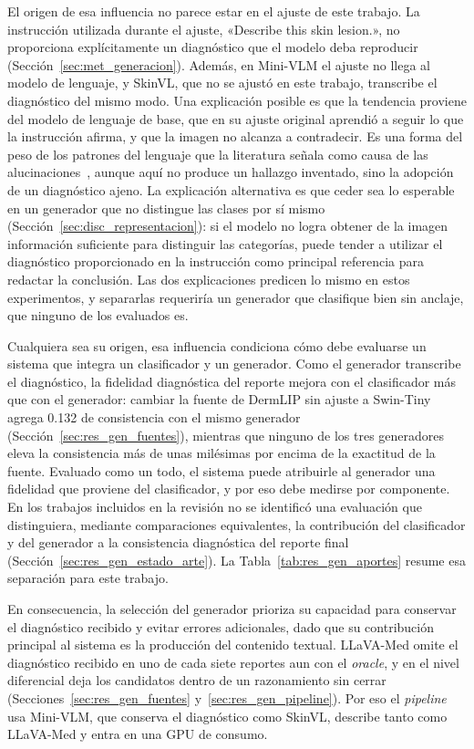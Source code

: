 El origen de esa influencia no parece estar en el ajuste de este trabajo. La instrucción utilizada durante el ajuste, «Describe this skin lesion.», no proporciona explícitamente un diagnóstico que el modelo deba reproducir (Sección~\ref{sec:met_generacion}). Además, en Mini-VLM el ajuste no llega al modelo de lenguaje, y SkinVL, que no se ajustó en este trabajo,
transcribe el diagnóstico del mismo modo. Una explicación posible es que la tendencia proviene del modelo de lenguaje
de base, que en su ajuste original aprendió a seguir lo que la instrucción afirma, y que la imagen no alcanza a
contradecir. Es una forma del peso de los patrones del lenguaje que la literatura señala como causa de las
alucinaciones~\cite{rohrbach2018object,bai2024hallucination}, aunque aquí no produce un hallazgo inventado, sino
la adopción de un diagnóstico ajeno. La explicación alternativa es que ceder sea lo esperable en un generador que no
distingue las clases por sí mismo (Sección~\ref{sec:disc_representacion}): si el modelo no logra obtener de la imagen información suficiente para distinguir las categorías, puede tender a utilizar el diagnóstico proporcionado en la instrucción como principal referencia para redactar la conclusión. Las dos explicaciones predicen lo mismo en estos experimentos,
y separarlas requeriría un generador que clasifique bien sin anclaje, que ninguno de los evaluados es.

Cualquiera sea su origen, esa influencia condiciona cómo debe evaluarse un sistema que integra un clasificador y un generador. Como el generador transcribe el
diagnóstico, la fidelidad diagnóstica del reporte mejora con el clasificador más que con el generador: cambiar la
fuente de DermLIP sin ajuste a Swin-Tiny agrega 0.132 de consistencia con el mismo generador
(Sección~\ref{sec:res_gen_fuentes}), mientras que ninguno de los tres generadores eleva la consistencia más de unas milésimas por encima de la exactitud de la fuente. Evaluado como un todo, el sistema puede atribuirle al generador una fidelidad que proviene del clasificador, y por eso debe medirse por componente. En los trabajos incluidos en la revisión no se identificó una evaluación que distinguiera, mediante comparaciones equivalentes, la contribución del clasificador y del generador a la consistencia diagnóstica del reporte final (Sección~\ref{sec:res_gen_estado_arte}). La Tabla~\ref{tab:res_gen_aportes} resume esa separación para este trabajo.

En consecuencia, la selección del generador prioriza su capacidad para conservar el diagnóstico recibido y evitar errores adicionales, dado que su contribución principal al sistema es la producción del contenido textual. LLaVA-Med omite el diagnóstico recibido en uno de cada siete
reportes aun con el \emph{oracle}, y en el nivel diferencial deja los candidatos dentro de un razonamiento sin cerrar
(Secciones~\ref{sec:res_gen_fuentes} y~\ref{sec:res_gen_pipeline}). Por eso el \emph{pipeline} usa Mini-VLM, que conserva el diagnóstico como SkinVL, describe tanto
como LLaVA-Med y entra en una GPU de consumo.

